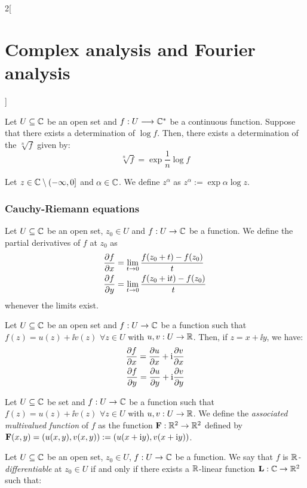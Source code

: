 \documentclass[../../../main.tex]{subfiles}
\begin{document}
\begin{multicols}{2}[\section{Complex analysis and Fourier analysis}]
\begin{definition}
  \end{definition}
  \begin{proposition}
    Let $U\subseteq\mathbb{C}$ be an open set and $f:U\longrightarrow\mathbb{C}^*$ be a continuous function. Suppose that there exists a determination of $\log f$. Then, there exists a determination of the $\sqrt[n]{f}$ given by: $$\sqrt[n]{f}=\exp{\frac{1}{n}\log f}$$
  \end{proposition}
  \begin{definition}
    Let $z\in\mathbb{C}\setminus(-\infty,0]$ and $\alpha\in\mathbb{C}$. We define $z^\alpha$ as $z^\alpha:=\exp{\alpha\log z}$.
  \end{definition}
  \subsubsection{Cauchy-Riemann equations}
  \begin{definition}
    Let $U\subseteq \mathbb{C}$ be an open set, $z_0 \in U$ and $f:U\rightarrow \mathbb{C}$ be a function. We define the partial derivatives of $f$ at $z_0$ as
    \begin{align*}
      \pdv{f}{x}(z_0) & =\lim_{t\to 0}\frac{f(z_0+t)-f(z_0)}{t}     \\
      \pdv{f}{y}(z_0) & =\lim_{t\to 0}\frac{f(z_0+\mathrm{i} t)-f(z_0)}{t}
    \end{align*}
    whenever the limits exist.
  \end{definition}
  \begin{proposition}
    Let $U\subseteq \mathbb{C}$ be an open set and $f:U\rightarrow \mathbb{C}$ be a function such that $f(z)=u(z)+\ii v(z)$ $\forall z\in U$ with $u,v:U\rightarrow\mathbb{R}$. Then, if $z=x+\ii y$, we have:
    \begin{align*}
      \pdv{f}{x}(z)=\pdv{u}{x}(z)+\mathrm{i}\pdv{v}{x}(z) \\
      \pdv{f}{y}(z)=\pdv{u}{y}(z)+\mathrm{i}\pdv{v}{y}(z)
    \end{align*}
  \end{proposition}
  \begin{definition}
    Let $U\subseteq \mathbb{C}$ be set and $f:U\rightarrow \mathbb{C}$ be a function such that $f(z)=u(z)+\ii v(z)$ $\forall z\in U$ with $u,v:U\rightarrow\mathbb{R}$. We define the \emph{associated multivalued function} of $f$ as the function $\boldsymbol{\mathrm{F}}:\mathbb{R}^2\rightarrow\mathbb{R}^2$ defined by $\boldsymbol{\mathrm{F}}(x,y)=(u(x,y),v(x,y)):=(u(x+\mathrm{i} y),v(x+\mathrm{i} y))$.
  \end{definition}
  \begin{definition}
    Let $U\subseteq \mathbb{C}$ be an open set, $z_0\in U$, $f:U\rightarrow \mathbb{C}$ be a function. We say that $f$ is \emph{$\mathbb{R}$-differentiable} at $z_0\in U$ if and only if there exists a $\mathbb{R}$-linear function $\boldsymbol{\mathrm{L}}:\mathbb{C}\rightarrow\mathbb{R}^2$ such that:

\end{definition}
\end{multicols}
\end{document}
